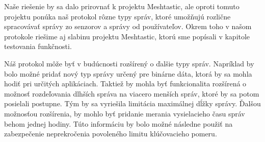 \documentclass[slovak,master]{diploma}
\begin{document}
Naše riešenie by sa dalo prirovnať k projektu Meshtastic, ale oproti tomuto projektu ponúka naš protokol rôzne typy správ, ktoré umožňujú 
rozlične spracovávať správy zo senzorov a správy od používateľov. Okrem toho v našom protokole riešime aj slabinu projektu Meshtastic, ktorú sme 
popísali v kapitole testovania funkčnosti.

Náš protokol môže byť v budúcnosti rozšírený o ďalšie typy správ. Napríklad by bolo možné pridať nový typ správy určený pre binárne dáta, 
ktorá by sa mohla hodiť pri určitých aplikáciach. 
Taktiež by mohla byť funkcionalita rozšírená o možnosť rozdeľovania dlhších správa na viacero menších správ, ktoré by sa potom posielali postupne. Tým by sa 
vyriešila limitácia maximálnej dĺžky správy. Ďalšou možnosťou rozšírenia, by mohlo byť pridanie merania vysielacieho času správ behom jednej hodiny. Túto informáciu 
by bolo možné následne použiť na zabezpečenie neprekročenia povoleného limitu klúčovacieho pomeru.

\printbibliography[title={Literatura}, heading=bibintoc]

\appendix
\chapter{}
\end{document}
